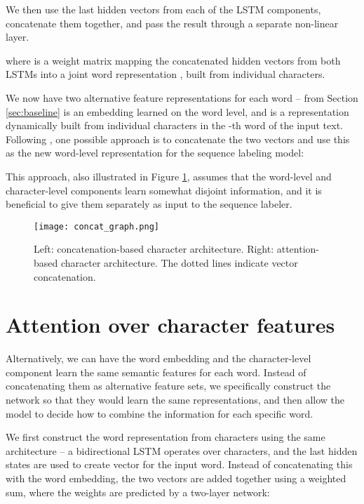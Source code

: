 \documentclass[11pt]{article}
\begin{document}
We then use the last hidden vectors from each of the LSTM components, concatenate them together, and pass the result through a separate non-linear layer.



\noindent where  is a weight matrix mapping the concatenated hidden vectors from both LSTMs into a joint word representation , built from individual characters.

We now have two alternative feature representations for each word --  from Section \ref{sec:baseline} is an embedding learned on the word level, and  is a representation dynamically built from individual characters in the -th word of the input text. Following , one possible approach is to concatenate the two vectors and use this as the new word-level representation for the sequence labeling model:



\noindent This approach, also illustrated in Figure \ref{fig:char}, assumes that the word-level and character-level components learn somewhat disjoint information, and it is beneficial to give them separately as input to the sequence labeler. 



\begin{figure}[t]
    \centering
	\texttt{[image: concat\_graph.png]}
	\caption{Left: concatenation-based character architecture. Right: attention-based character architecture. The dotted lines indicate vector concatenation.}
	\label{fig:char}
\end{figure}



\section{Attention over character features}
\label{sec:attn}

Alternatively, we can have the word embedding and the character-level component learn the same semantic features for each word. Instead of concatenating them as alternative feature sets, we specifically construct the network so that they would learn the same representations, and then allow the model to decide how to combine the information for each specific word.

We first construct the word representation from characters using the same architecture -- a bidirectional LSTM operates over characters, and the last hidden states are used to create vector  for the input word. Instead of concatenating this with the word embedding, the two vectors are added together using a weighted sum, where the weights are predicted by a two-layer network:
\end{document}
